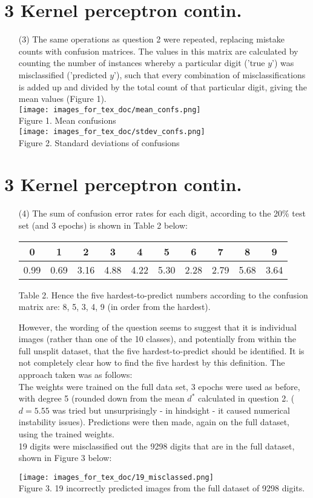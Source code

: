 \documentclass[a4paper,12pt]{article}
\begin{document}
\section*{3 Kernel perceptron contin.}
\begin{enumerate}

\item[(3)]
The same operations as question 2 were repeated, replacing mistake counts with confusion matrices. The values in this matrix are calculated by counting the number of instances whereby a particular digit ('true $y$') was misclassified ('predicted $y$'), such that every combination of misclassifications is added up and divided by the total count of that particular digit, giving the mean values (Figure 1). \\
\texttt{[image: images\_for\_tex\_doc/mean\_confs.png]}\\
Figure 1. Mean confusions \\
\texttt{[image: images\_for\_tex\_doc/stdev\_confs.png]}\\
Figure 2. Standard deviations of confusions\\
\end{enumerate}
\clearpage
\section*{3 Kernel perceptron contin.}
\begin{enumerate}
\item[(4)]
The sum of confusion error rates for each digit, according to the 20\% test set (and 3 epochs) is shown in Table 2 below:

\begin{tabular}{|c|c|c|c|c|c|c|c|c|c|}
\hline
0&1&2&3&4&5&6&7&8&9\\
\hline
0.99&0.69&3.16&4.88&4.22&5.30&2.28&2.79&5.68&3.64\\
\hline
\end{tabular}\par 
Table 2.
Hence the five hardest-to-predict numbers according to the confusion matrix are: 8, 5, 3, 4, 9 (in order from the hardest).

However, the wording of the question seems to suggest that it is individual images (rather than one of the 10 classes), and potentially from within the full unsplit dataset, that the five hardest-to-predict should be identified. It is not completely clear how to find the five hardest by this definition. The approach taken was as follows:\\
The weights were trained on the full data set, 3 epochs were used as before, with degree 5 (rounded down from the mean $d^*$ calculated in question 2. ($d=5.55$ was tried but unsurprisingly - in hindsight - it caused numerical instability issues). Predictions were then made, again on the full dataset, using the trained weights. \\
19 digits were misclassified out the 9298 digits that are in the full dataset, shown in Figure 3 below:

\texttt{[image: images\_for\_tex\_doc/19\_misclassed.png]}\\
Figure 3. 19 incorrectly predicted images from the full dataset of 9298 digits.
\end{enumerate}
\clearpage
\end{document}
